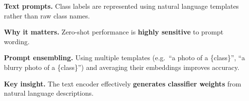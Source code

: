 \textbf{Text prompts.}
Class labels are represented using natural language templates
rather than raw class names.

\textbf{Why it matters.}
Zero-shot performance is \textbf{highly sensitive} to prompt wording.

\textbf{Prompt ensembling.}
Using multiple templates
(e.g.\ ``a photo of a \{class\}'', ``a blurry photo of a \{class\}'')
and averaging their embeddings improves accuracy.

\textbf{Key insight.}
The text encoder effectively \textbf{generates classifier weights}
from natural language descriptions.
